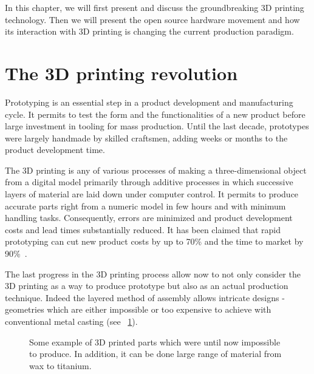 In this chapter, we will first present and discuss the groundbreaking 3D printing technology. Then we will present the open source hardware movement and how its interaction with 3D printing is changing the current production paradigm.


\section{The 3D printing revolution} %

Prototyping is an essential step in a product development and manufacturing cycle. It permits to test the form and the functionalities of a new product before large investment in tooling for mass production. Until the last decade, prototypes were largely handmade by skilled craftsmen, adding weeks or months to the product development time.

The 3D printing is any of various processes of making a three-dimensional object from a digital model primarily through additive processes in which successive layers of material are laid down under computer control.
It permits to produce accurate parts right from a numeric model in few hours and with minimum handling tasks. Consequently, errors are minimized and product development costs and lead times substantially reduced. It has been claimed that rapid prototyping can cut new product costs by up to 70\% and the time to market by 90\%~\cite{waterman1994rapid}.

The last progress in the 3D printing process allow now to not only consider the 3D printing as a way to produce prototype but also as an actual production technique. Indeed the layered method of assembly allows intricate designs - geometries which are either impossible or too expensive to achieve with conventional metal casting (see \figurename~\ref{fig:3D_printed_objects}).


\begin{figure}[!b]
\centering
    \hfil
    \hfil
    \caption{Some example of 3D printed parts which were until now impossible to produce. In addition, it can be done large range of material from wax to titanium.}
    \label{fig:3D_printed_objects}
\end{figure}

